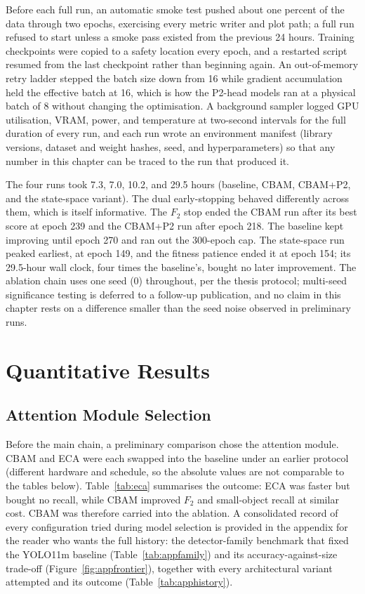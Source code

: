 Before each full run, an automatic smoke test pushed about one percent of the
data through two epochs, exercising every metric writer and plot path; a full
run refused to start unless a smoke pass existed from the previous 24 hours.
Training checkpoints were copied to a safety location every epoch, and a
restarted script resumed from the last checkpoint rather than beginning
again. An out-of-memory retry ladder stepped the batch size down from 16
while gradient accumulation held the effective batch at 16, which is how the
P2-head models ran at a physical batch of 8 without changing the
optimisation. A background sampler logged GPU utilisation, VRAM, power, and
temperature at two-second intervals for the full duration of every run, and
each run wrote an environment manifest (library versions, dataset and weight
hashes, seed, and hyperparameters) so that any number in this chapter can be
traced to the run that produced it.

The four runs took 7.3, 7.0, 10.2, and 29.5 hours (baseline, CBAM, CBAM+P2,
and the state-space variant). The dual early-stopping behaved differently
across them, which is itself informative. The $F_2$ stop ended the CBAM run
after its best score at epoch 239 and the CBAM+P2 run after epoch 218. The
baseline kept improving until epoch 270 and ran out the 300-epoch cap. The
state-space run peaked earliest, at epoch 149, and the fitness patience ended
it at epoch 154; its 29.5-hour wall clock, four times the baseline's, bought
no later improvement. The ablation chain uses one seed (0) throughout, per
the thesis protocol; multi-seed significance testing is deferred to a
follow-up publication, and no claim in this chapter rests on a difference
smaller than the seed noise observed in preliminary runs.

\section{Quantitative Results}
\label{sec:quant}

\subsection{Attention Module Selection}
Before the main chain, a preliminary comparison chose the attention module.
CBAM and ECA were each swapped into the baseline under an earlier protocol
(different hardware and schedule, so the absolute values are not comparable
to the tables below). Table~\ref{tab:eca} summarises the outcome: ECA was
faster but bought no recall, while CBAM improved $F_2$ and small-object
recall at similar cost. CBAM was therefore carried into the ablation. A
consolidated record of every configuration tried during model selection is
provided in the appendix for the reader who wants the full history: the
detector-family benchmark that fixed the YOLO11m baseline
(Table~\ref{tab:appfamily}) and its accuracy-against-size trade-off
(Figure~\ref{fig:appfrontier}), together with every architectural variant
attempted and its outcome (Table~\ref{tab:apphistory}).


